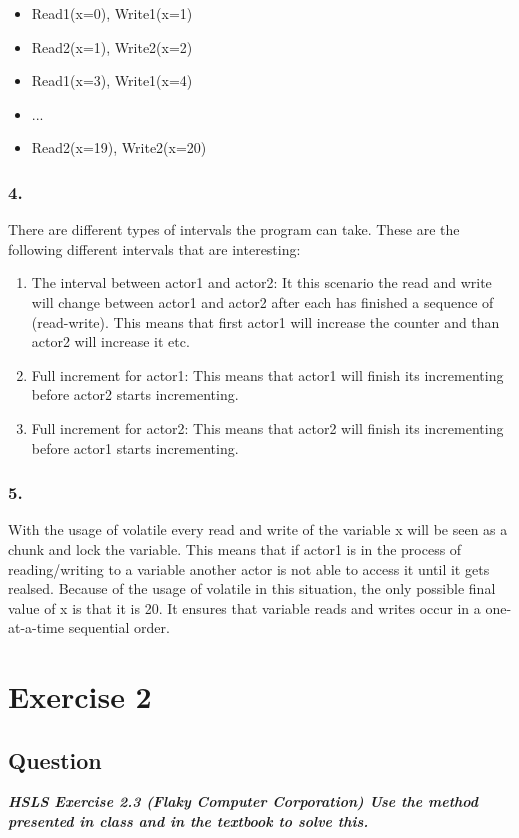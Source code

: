\documentclass{article}
\begin{document}
\begin{itemize}
    \item Read1(x=0), Write1(x=1)
    \item Read2(x=1), Write2(x=2)
    \item Read1(x=3), Write1(x=4)
    \item ...
    \item Read2(x=19), Write2(x=20)
\end{itemize}


\subsubsection*{4.}
There are different types of intervals the program can take. These are the following different intervals that are interesting:

\begin{enumerate}
    \item The interval between actor1 and actor2: It this scenario the read and write will change between actor1 and actor2 after each has finished a sequence of (read-write). This means that first actor1 will increase the counter and than actor2 will increase it etc.
    \item Full increment for actor1: This means that actor1 will finish its incrementing before actor2 starts incrementing.
    \item Full increment for actor2: This means that actor2 will finish its incrementing before actor1 starts incrementing.
\end{enumerate}


\subsubsection*{5.}
With the usage of volatile every read and write of the variable x will be seen as a chunk and lock the variable. This means that if actor1 is in the process of reading/writing to a variable another actor is not able to access it until it gets realsed. Because of the usage of volatile in this situation, the only possible final value of x is that it is 20. It ensures that variable reads and writes occur in a one-at-a-time sequential order.


\section*{Exercise 2}
\subsection*{Question}
\textit{\textbf{HSLS Exercise 2.3 (Flaky Computer Corporation) Use the method presented in class and in the textbook to solve this.}}
\end{document}
